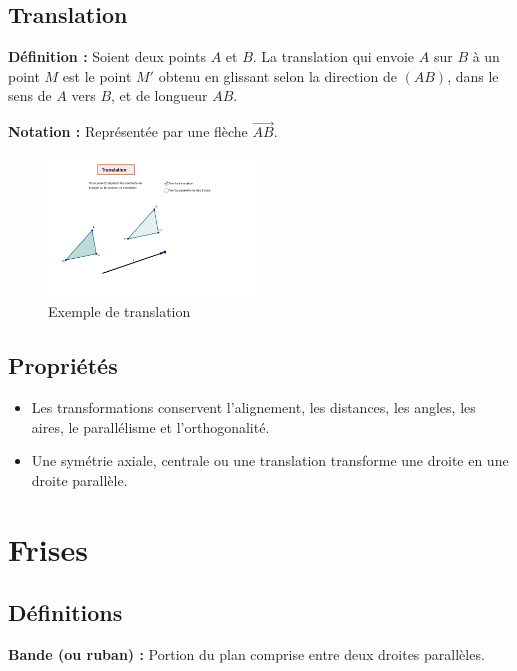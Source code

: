 \documentclass[12pt]{article}
\begin{document}
    \subsection{Translation}

    \textbf{Définition :} Soient deux points \( A \) et \( B \). La translation qui envoie \( A \) sur \( B \) à un point \( M \) est le point \( M' \) obtenu en glissant selon la direction de \( (AB) \), dans le sens de \( A \) vers \( B \), et de longueur \( AB \).

    \textbf{Notation :} Représentée par une flèche \( \vec{AB} \).
    \begin{figure}[H]
        \centering
        \includegraphics[width=0.5\textwidth]{translation.png}
        \caption{Exemple de translation}
    \end{figure}
    \subsection{Propriétés}

    \begin{itemize}
        \item Les transformations conservent l’alignement, les distances, les angles, les aires, le parallélisme et l’orthogonalité.
        \item Une symétrie axiale, centrale ou une translation transforme une droite en une droite parallèle.
    \end{itemize}

    \section{Frises}

    \subsection{Définitions}

    \textbf{Bande (ou ruban) :} Portion du plan comprise entre deux droites parallèles.
\end{document}
